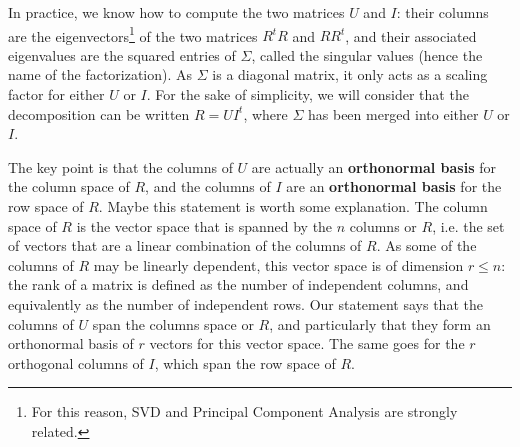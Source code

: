In practice, we know how to compute the two matrices $U$ and $I$: their
columns are the
eigenvectors\footnote{For this reason, SVD and Principal Component Analysis are
strongly related.} of the two matrices $R^tR$ and $RR^t$, and their associated
eigenvalues are the squared entries of $\Sigma$, called the singular values
(hence the name of the factorization).
As $\Sigma$ is a diagonal matrix, it only acts as a scaling factor for either $U$ or
$I$. For the sake of simplicity, we will consider that the decomposition can be
written $R = UI^t$, where $\Sigma$ has been merged into either $U$ or $I$.

The key point is that the columns of $U$ are actually an \textbf{orthonormal
basis} for
the column space of $R$, and the columns of $I$ are an \textbf{orthonormal
basis} for the
row space of $R$. Maybe this statement is worth some explanation. The column
space of $R$ is the vector space that is spanned by the $n$ columns or $R$,
i.e. the set of vectors that are a linear combination of the columns of $R$. As
some of the columns of $R$ may be linearly dependent, this vector space is of
dimension $r\leq n$: the rank of a matrix is defined as the number of
independent columns, and equivalently as the number of independent rows. Our
statement says that the columns of $U$ span the columns space or $R$, and
particularly that they form an orthonormal basis of $r$ vectors for this vector
space. The same goes for the $r$ orthogonal columns of $I$, which span the row
space of $R$.

